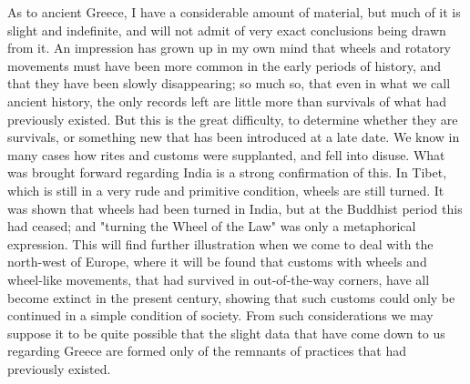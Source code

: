 \documentclass[a4paper, 11pt, oneside, polutonikogreek, english]{article}
\begin{document}
As to ancient Greece, I have a considerable amount of material, but much of it is slight and indefinite, and will not admit of very exact conclusions being drawn from it. An impression has grown up in my own mind that wheels and rotatory movements must have been more common in the early periods of history, and that they have been slowly disappearing; so much so, that even in what we call ancient history, the only records left are little more than survivals of what had previously existed. But this is the great difficulty, to determine whether they are survivals, or something new that has been introduced at a late date. We know in many cases how rites and customs were supplanted, and fell into disuse. What was brought forward regarding India is a strong confirmation of this. In Tibet, which is still in a very rude and primitive condition, wheels are still turned. It was shown that wheels had been turned in India, but at the Buddhist period this had ceased; and "turning the Wheel of the Law" was only a metaphorical expression. This will find further illustration when we come to deal with the north-west of Europe, where it will be found that customs with wheels and wheel-like movements, that had survived in out-of-the-way corners, have all become extinct in the present century, showing that such customs could only be continued in a simple condition of society. From such considerations we may suppose it to be quite possible that the slight data that have come down to us regarding Greece are formed only of the remnants of practices that had previously existed.
\end{document}
